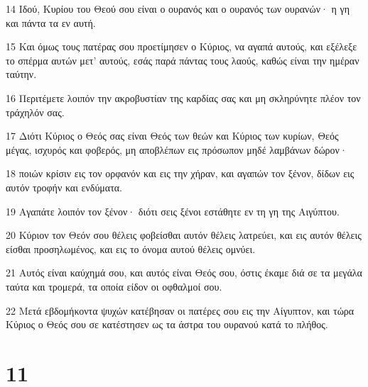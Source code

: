 \par 14 Ιδού, Κυρίου του Θεού σου είναι ο ουρανός και ο ουρανός των ουρανών· η γη και πάντα τα εν αυτή.
\par 15 Και όμως τους πατέρας σου προετίμησεν ο Κύριος, να αγαπά αυτούς, και εξέλεξε το σπέρμα αυτών μετ' αυτούς, εσάς παρά πάντας τους λαούς, καθώς είναι την ημέραν ταύτην.
\par 16 Περιτέμετε λοιπόν την ακροβυστίαν της καρδίας σας και μη σκληρύνητε πλέον τον τράχηλόν σας.
\par 17 Διότι Κύριος ο Θεός σας είναι Θεός των θεών και Κύριος των κυρίων, Θεός μέγας, ισχυρός και φοβερός, μη αποβλέπων εις πρόσωπον μηδέ λαμβάνων δώρον·
\par 18 ποιών κρίσιν εις τον ορφανόν και εις την χήραν, και αγαπών τον ξένον, δίδων εις αυτόν τροφήν και ενδύματα.
\par 19 Αγαπάτε λοιπόν τον ξένον· διότι σεις ξένοι εστάθητε εν τη γη της Αιγύπτου.
\par 20 Κύριον τον Θεόν σου θέλεις φοβείσθαι αυτόν θέλεις λατρεύει, και εις αυτόν θέλεις είσθαι προσηλωμένος, και εις το όνομα αυτού θέλεις ομνύει.
\par 21 Αυτός είναι καύχημά σου, και αυτός είναι Θεός σου, όστις έκαμε διά σε τα μεγάλα ταύτα και τρομερά, τα οποία είδον οι οφθαλμοί σου.
\par 22 Μετά εβδομήκοντα ψυχών κατέβησαν οι πατέρες σου εις την Αίγυπτον, και τώρα Κύριος ο Θεός σου σε κατέστησεν ως τα άστρα του ουρανού κατά το πλήθος.

\chapter{11}

